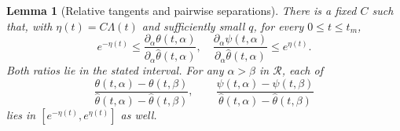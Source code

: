 \documentclass[11pt]{article}
\newtheorem{lemma}[theorem]{Lemma}
\theoremstyle{remark}\newtheorem{remark}[theorem]{Remark}
\newcommand{\Rhalf}{\mathcal R}
\begin{document}
\begin{lemma}[Relative tangents and pairwise separations]
\label{an02owptv1:tangents}
There is a fixed $C$ such that, with $\eta(t)=C\Lambda(t)$ and
sufficiently small $q$, for every $0\le t\le t_m$,
\begin{equation}\label{an02owptv1:tangentrange}
 e^{-\eta(t)}\le
 \frac{\partial_\alpha\theta(t,\alpha)}{
       \partial_\alpha\widehat\theta(t,\alpha)},\quad
 \frac{\partial_\alpha\psi(t,\alpha)}{
       \partial_\alpha\widehat\theta(t,\alpha)}
 \le e^{\eta(t)}.
\end{equation}
Both ratios lie in the stated interval. For any $\alpha>\beta$
in $\Rhalf$, each of
\begin{equation}\label{an02owptv1:pairs}
 \frac{\theta(t,\alpha)-\theta(t,\beta)}{
       \widehat\theta(t,\alpha)-\widehat\theta(t,\beta)},\qquad
 \frac{\psi(t,\alpha)-\psi(t,\beta)}{
       \widehat\theta(t,\alpha)-\widehat\theta(t,\beta)}
\end{equation}
lies in $[e^{-\eta(t)},e^{\eta(t)}]$ as well.
\end{lemma}
\end{document}
